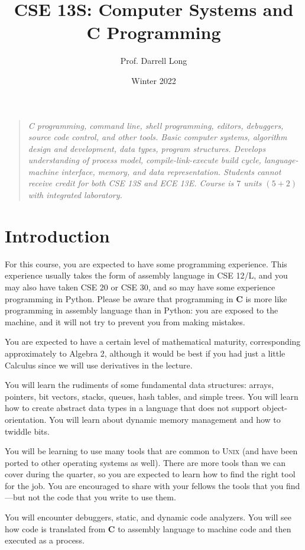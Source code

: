 \documentclass[12pt]{article}
\title{CSE 13S: Computer Systems and \textbf{C} Programming}
\author{Prof.\xspace Darrell Long}
\date{Winter 2022}
\begin{document}
\maketitle
\begin{quotation}
\emph{
C programming, command line, shell programming, editors, debuggers,
source code control, and other tools. Basic computer systems,
algorithm design and development, data types, program structures.
Develops understanding of process model, compile-link-execute build
cycle, language-machine interface, memory, and data representation.
Students cannot receive credit for both CSE 13S and ECE 13E. Course
is $7$ units $(5 + 2)$ with integrated laboratory.
}
\end{quotation}

\section{Introduction}

For this course, you are expected to have some programming experience.
This experience usually takes the form of assembly language in CSE
12/L, and you may also have taken CSE 20 or CSE 30, and so may have
some experience programming in Python. Please be aware that programming
in \textbf{C} is more like programming in assembly language than
in Python: you are exposed to the machine, and it will not try to
prevent you from making mistakes.

You are expected to have a certain level of mathematical maturity,
corresponding approximately to Algebra 2, although it would be best if
you had just a little Calculus since we will use derivatives in the
lecture.

You will learn the rudiments of some fundamental data structures:
arrays, pointers, bit vectors, stacks, queues, hash tables, and simple
trees. You will learn how to create abstract data types in a language
that does not support object-orientation. You will learn about dynamic
memory management and how to twiddle bits.

You will be learning to use many tools that are common to \textsc{Unix}
(and have been ported to other operating systems as well). There are
more tools than we can cover during the quarter, so you are expected to
learn how to find the right tool for the job. You are encouraged to
share with your fellows the tools that you find---but not the code that
you write to use them.

You will encounter debuggers, static, and dynamic code analyzers. You
will see how code is translated from \textbf{C} to assembly language to
machine code and then executed as a process.
\end{document}
